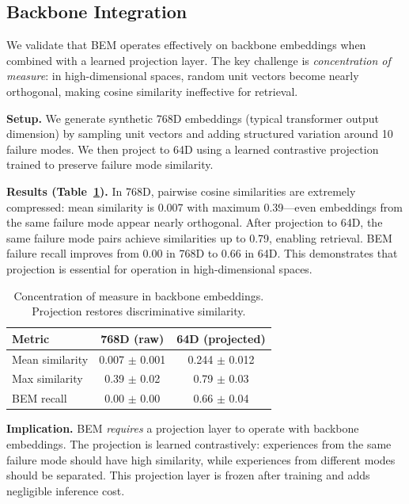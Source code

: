 \documentclass[twoside,11pt]{article}
\begin{document}
\subsection{Backbone Integration}
\label{sec:backbone}

We validate that BEM operates effectively on backbone embeddings when combined with a learned projection layer. The key challenge is \textit{concentration of measure}: in high-dimensional spaces, random unit vectors become nearly orthogonal, making cosine similarity ineffective for retrieval.

\textbf{Setup.} We generate synthetic 768D embeddings (typical transformer output dimension) by sampling unit vectors and adding structured variation around 10 failure modes. We then project to 64D using a learned contrastive projection trained to preserve failure mode similarity.

\textbf{Results (Table~\ref{tab:backbone}).} In 768D, pairwise cosine similarities are extremely compressed: mean similarity is 0.007 with maximum 0.39---even embeddings from the same failure mode appear nearly orthogonal. After projection to 64D, the same failure mode pairs achieve similarities up to 0.79, enabling retrieval. BEM failure recall improves from 0.00 in 768D to 0.66 in 64D. This demonstrates that projection is essential for operation in high-dimensional spaces.

\begin{table}[t]
\centering
\caption{Concentration of measure in backbone embeddings. Projection restores discriminative similarity.}
\label{tab:backbone}
\begin{tabular}{lcc}
\toprule
\textbf{Metric} & \textbf{768D (raw)} & \textbf{64D (projected)} \\
\midrule
Mean similarity & 0.007 \small{$\pm$ 0.001} & 0.244 \small{$\pm$ 0.012} \\
Max similarity & 0.39 \small{$\pm$ 0.02} & 0.79 \small{$\pm$ 0.03} \\
BEM recall & 0.00 \small{$\pm$ 0.00} & 0.66 \small{$\pm$ 0.04} \\
\bottomrule
\end{tabular}
\end{table}

\textbf{Implication.} BEM \textit{requires} a projection layer to operate with backbone embeddings. The projection is learned contrastively: experiences from the same failure mode should have high similarity, while experiences from different modes should be separated. This projection layer is frozen after training and adds negligible inference cost.
\end{document}
